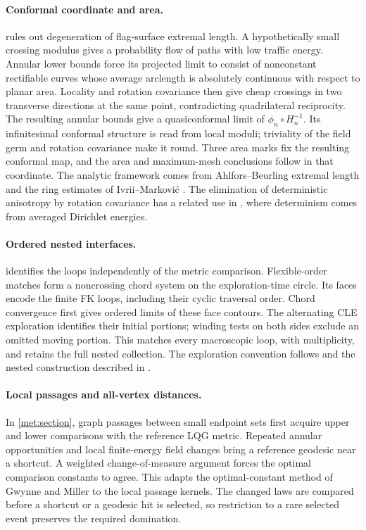 \paragraph{Conformal coordinate and area.}
 rules out degeneration of flag-surface extremal
length. A hypothetically small crossing modulus gives a probability
flow of paths with low traffic energy. Annular lower bounds force its
projected limit to consist of nonconstant rectifiable curves whose
average arclength is absolutely continuous with respect to planar area.
Locality and rotation covariance then give cheap crossings in two
transverse directions at the same point, contradicting quadrilateral
reciprocity. The resulting annular bounds give a quasiconformal limit
of $\phi_n\circ H_n^{-1}$. Its infinitesimal conformal structure is
read from local moduli; triviality of the field germ and rotation
covariance make it round. Three area marks fix the resulting conformal
map, and the area and maximum-mesh conclusions follow in that coordinate.
The analytic framework comes from Ahlfors--Beurling extremal length
\citep{AhlforsBeurling1952ConformalInvariants} and the ring estimates of
Ivrii--Markovi\'c \citep{IvriiMarkovic2019}. The elimination of
deterministic anisotropy by rotation covariance has a related use in
\citet[Section~4.4]{HoldenYuUniformization}, where determinism comes
from averaged Dirichlet energies.

\paragraph{Ordered nested interfaces.}
 identifies the loops independently of the metric
comparison. Flexible-order matches form a noncrossing chord system
on the exploration-time circle. Its faces encode the finite FK loops,
including their cyclic traversal order. Chord convergence first gives
ordered limits of these face contours. The alternating CLE exploration
identifies their initial portions; winding tests on both sides exclude
an omitted moving portion. This matches every macroscopic loop, with
multiplicity, and retains the full nested collection. The exploration
convention follows \citet{SheffieldExplorationTrees,MillerSheffieldIGIV}
and the nested construction described in
\citet[Section~2.1.6]{AruHoldenPowellSunCritical}.

\paragraph{Local passages and all-vertex distances.}
In \cref{met:section}, graph passages between small endpoint sets
first acquire upper and lower comparisons with the reference LQG
metric. Repeated annular opportunities and local finite-energy field
changes bring a reference geodesic near a shortcut. A weighted
change-of-measure argument forces the optimal comparison constants
to agree. This adapts the optimal-constant method of Gwynne and
Miller \citep[Section~1.5 and Sections~3--6]{GwynneMillerMetric} to
the local passage kernels. The changed laws are compared before a
shortcut or a geodesic hit is selected, so restriction to a rare
selected event preserves the required domination.

